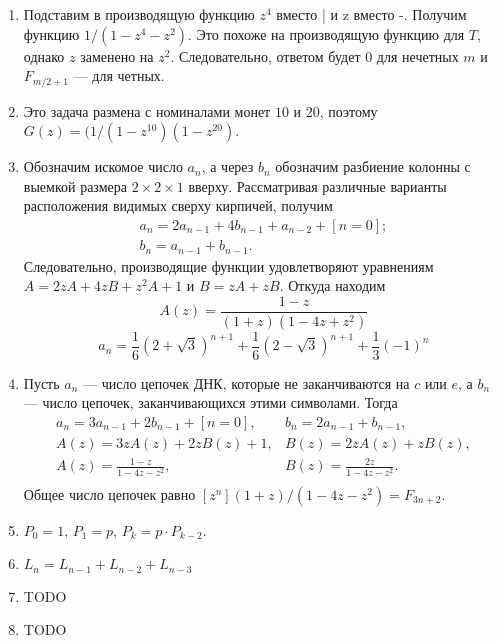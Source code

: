 \documentclass[14pt,openany]{book}
\begin{document}
\begin{enumerate}
\item Подставим в производящую функцию $z^4$ вместо | и z вместо -. Получим функцию $1/(1-z^4-z^2)$.
Это похоже на производящую функцию для $T$, однако $z$ заменено на $z^2$. Следовательно, 
ответом будет $0$ для нечетных $m$ и $F_{m/2+1}$ --- для четных.

\item Это задача размена с номиналами монет $10$ и $20$, поэтому $G(z)=(1/(1-z^{10})(1-z^{20})$.

\item Обозначим искомое число $a_n$, а через $b_n$ обозначим разбиение колонны с выемкой размера
      $2 \times 2 \times 1$ вверху. Рассматривая различные варианты расположения видимых сверху
      кирпичей, получим
$$
\begin{array}{ll}
a_n = 2a_{n-1} + 4b_{n-1} + a_{n-2} + [n=0]; \\
b_n = a_{n-1} + b_{n-1}.
\end{array}
$$
      Следовательно, производящие функции удовлетворяют уравнениям $A = 2zA+4zB+z^2A+1$ и
      $B = zA + zB$. Откуда находим $$A(z) = \frac{1-z}{(1+z)(1-4z+z^2)}$$
      $$a_n = \frac{1}{6}(2+\sqrt{3})^{n+1} + \frac{1}{6}(2-\sqrt{3})^{n+1} + \frac{1}{3}(-1)^n$$

\item Пусть $a_n$ --- число цепочек ДНК, которые не заканчиваются на $c$ или $e$, а $b_n$ --- число
      цепочек, заканчивающихся этими символами. Тогда
      $$
      \begin{array}{ll}
      a_n = 3a_{n-1}+2b_{n-1}+[n=0], & b_n = 2a_{n-1} + b_{n-1}, \\
      A(z) = 3zA(z) + 2zB(z) + 1,    & B(z) = 2zA(z) + zB(z), \\
      A(z) = \frac{1-z}{1-4z-z^2},   & B(z) = \frac{2z}{1-4z-z^2}. \\
      \end{array}
      $$
      Общее число цепочек равно $[z^n](1+z)/(1-4z-z^2) = F_{3n+2}$.

\item $P_0 = 1$, $P_1 = p$, $P_k = p\cdot P_{k-2}$.

\item $L_n = L_{n-1} + L_{n-2} + L_{n-3}$

\item TODO

\item TODO

\end{enumerate}
\end{document}
